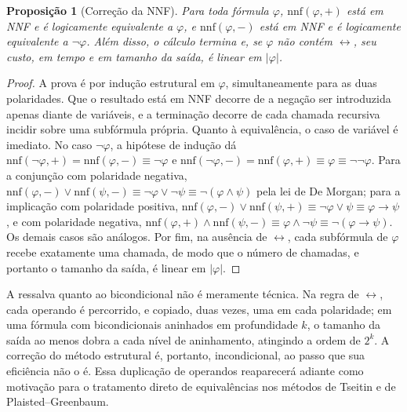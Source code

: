 \documentclass[12pt,a4paper,oneside]{report}
\theoremstyle{tituloplain}
\newtheorem{proposicao}[teorema]{Proposição}
\theoremstyle{titulodef}
\begin{document}
\begin{proposicao}[Correção da NNF]\label{prop:nnf}
Para toda fórmula $\varphi$, $\mathrm{nnf}(\varphi,+)$ está em NNF e é logicamente equivalente a $\varphi$, e $\mathrm{nnf}(\varphi,-)$ está em NNF e é logicamente equivalente a $\neg\varphi$. Além disso, o cálculo termina e, se $\varphi$ não contém $\leftrightarrow$, seu custo, em tempo e em tamanho da saída, é linear em $|\varphi|$.
\end{proposicao}
\begin{proof}
A prova é por indução estrutural em $\varphi$, simultaneamente para as duas polaridades. Que o resultado está em NNF decorre de a negação ser introduzida apenas diante de variáveis, e a terminação decorre de cada chamada recursiva incidir sobre uma subfórmula própria. Quanto à equivalência, o caso de variável é imediato. No caso $\neg\varphi$, a hipótese de indução dá $\mathrm{nnf}(\neg\varphi,+)=\mathrm{nnf}(\varphi,-)\equiv\neg\varphi$ e $\mathrm{nnf}(\neg\varphi,-)=\mathrm{nnf}(\varphi,+)\equiv\varphi\equiv\neg\neg\varphi$. Para a conjunção com polaridade negativa, $\mathrm{nnf}(\varphi,-)\vee\mathrm{nnf}(\psi,-)\equiv\neg\varphi\vee\neg\psi\equiv\neg(\varphi\wedge\psi)$ pela lei de De Morgan; para a implicação com polaridade positiva, $\mathrm{nnf}(\varphi,-)\vee\mathrm{nnf}(\psi,+)\equiv\neg\varphi\vee\psi\equiv\varphi\rightarrow\psi$, e com polaridade negativa, $\mathrm{nnf}(\varphi,+)\wedge\mathrm{nnf}(\psi,-)\equiv\varphi\wedge\neg\psi\equiv\neg(\varphi\rightarrow\psi)$. Os demais casos são análogos. Por fim, na ausência de $\leftrightarrow$, cada subfórmula de $\varphi$ recebe exatamente uma chamada, de modo que o número de chamadas, e portanto o tamanho da saída, é linear em $|\varphi|$.
\end{proof}
 
A ressalva quanto ao bicondicional não é meramente técnica. Na regra de $\leftrightarrow$, cada operando é percorrido, e copiado, duas vezes, uma em cada polaridade; em uma fórmula com bicondicionais aninhados em profundidade $k$, o tamanho da saída ao menos dobra a cada nível de aninhamento, atingindo a ordem de $2^k$. A correção do método estrutural é, portanto, incondicional, ao passo que sua eficiência não o é. Essa duplicação de operandos reaparecerá adiante como motivação para o tratamento direto de equivalências nos métodos de Tseitin e de Plaisted--Greenbaum.
 
\end{document}
